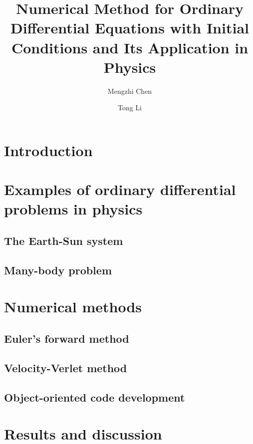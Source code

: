 \documentclass{article}
\title{Numerical Method for Ordinary Differential Equations with Initial Conditions and Its Application in Physics}
\author[1]{Mengzhi Chen}
\author[1]{Tong Li}
\affil[1]{Department of Physics and Astronomy, Michigan State University}
\date{}
\begin{document}
	\maketitle
	\begin{abstract}\label{abstract}
	
	\end{abstract}

\section{Introduction}\label{intro} 

	
\section{Examples of ordinary differential problems in physics}\label{physcis_problem}
	
	\subsection{The Earth-Sun system}\label{earthsun}
	
	
	\subsection{Many-body problem}\label{quantumdot}
	
	
\section{Numerical methods}\label{method}
  
	\subsection{Euler's forward method}\label{euler}
	
	
	\subsection{Velocity-Verlet method} \label{verlet}
	
	
	\subsection{Object-oriented code development}\label{obj}
	
	
\section{Results and discussion}\label{results}
\end{document}
